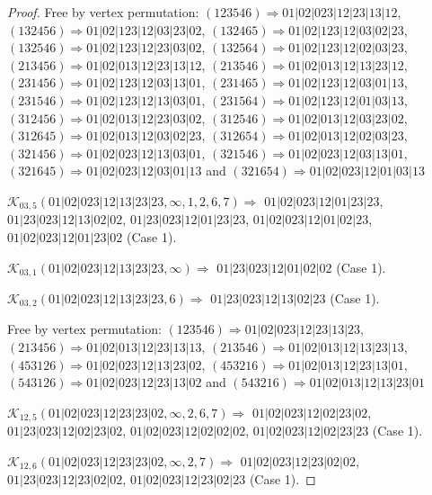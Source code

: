 \documentclass[12pt]{article}
\theoremstyle{plain}
\theoremstyle{definition}
\theoremstyle{remark}
\newcommand{\fancy}[1]{\mathcal{#1}}
\def\K{\fancy{K}}
\begin{document}
\begin{proof}
	
	
	Free by vertex permutation: $(1 2 3 5 4 6)\Rightarrow 01|02|023|12|23|13|12$, $(1 3 2 4 5 6)\Rightarrow 01|02|123|12|03|23|02$, $(1 3 2 4 6 5)\Rightarrow 01|02|123|12|03|02|23$, $(1 3 2 5 4 6)\Rightarrow 01|02|123|12|23|03|02$, $(1 3 2 5 6 4)\Rightarrow 01|02|123|12|02|03|23$, $(2 1 3 4 5 6)\Rightarrow 01|02|013|12|23|13|12$, $(2 1 3 5 4 6)\Rightarrow 01|02|013|12|13|23|12$, $(2 3 1 4 5 6)\Rightarrow 01|02|123|12|03|13|01$, $(2 3 1 4 6 5)\Rightarrow 01|02|123|12|03|01|13$, $(2 3 1 5 4 6)\Rightarrow 01|02|123|12|13|03|01$, $(2 3 1 5 6 4)\Rightarrow 01|02|123|12|01|03|13$, $(3 1 2 4 5 6)\Rightarrow 01|02|013|12|23|03|02$, $(3 1 2 5 4 6)\Rightarrow 01|02|013|12|03|23|02$, $(3 1 2 6 4 5)\Rightarrow 01|02|013|12|03|02|23$, $(3 1 2 6 5 4)\Rightarrow 01|02|013|12|02|03|23$, $(3 2 1 4 5 6)\Rightarrow 01|02|023|12|13|03|01$, $(3 2 1 5 4 6)\Rightarrow 01|02|023|12|03|13|01$, $(3 2 1 6 4 5)\Rightarrow 01|02|023|12|03|01|13$ and $(3 2 1 6 5 4)\Rightarrow 01|02|023|12|01|03|13$
	
	
	
	\bigskip
	
	$\K_{03,5}(01|02|023|12|13|23|23,\infty,1, 2, 6, 7)\Rightarrow $ $01|02|023|12|01|23|23$, $01|23|023|12|13|02|02$, $01|23|023|12|01|23|23$, $01|02|023|12|01|02|23$, $01|02|023|12|01|23|02$ (Case 1).
	
	$\K_{03,1}(01|02|023|12|13|23|23,\infty)\Rightarrow $ $01|23|023|12|01|02|02$ (Case 1).
	
	$\K_{03,2}(01|02|023|12|13|23|23,6)\Rightarrow $ $01|23|023|12|13|02|23$ (Case 1).
	
	
	
	Free by vertex permutation: $(1 2 3 5 4 6)\Rightarrow 01|02|023|12|23|13|23$, $(2 1 3 4 5 6)\Rightarrow 01|02|013|12|23|13|13$, $(2 1 3 5 4 6)\Rightarrow 01|02|013|12|13|23|13$, $(4 5 3 1 2 6)\Rightarrow 01|02|023|12|13|23|02$, $(4 5 3 2 1 6)\Rightarrow 01|02|013|12|23|13|01$, $(5 4 3 1 2 6)\Rightarrow 01|02|023|12|23|13|02$ and $(5 4 3 2 1 6)\Rightarrow 01|02|013|12|13|23|01$
	
	
	
	\bigskip
	
	$\K_{12,5}(01|02|023|12|23|23|02,\infty,2, 6, 7)\Rightarrow $ $01|02|023|12|02|23|02$, $01|23|023|12|02|23|02$, $01|02|023|12|02|02|02$, $01|02|023|12|02|23|23$ (Case 1).
	
	$\K_{12,6}(01|02|023|12|23|23|02,\infty,2, 7)\Rightarrow $ $01|02|023|12|23|02|02$, $01|23|023|12|23|02|02$, $01|02|023|12|23|02|23$ (Case 1).
	

\end{proof}
\end{document}
